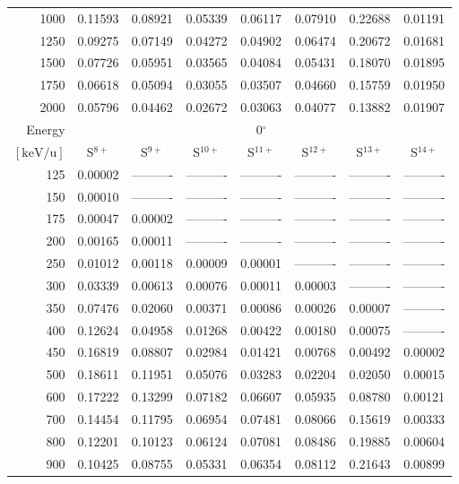 \begin{table}[ht]
\begin{tabular}{r|c|c|c|c|c|c|c}
     1000 & 0.11593 & 0.08921 & 0.05339 & 0.06117 & 0.07910 & 0.22688 & 0.01191 \\
     1250 & 0.09275 & 0.07149 & 0.04272 & 0.04902 & 0.06474 & 0.20672 & 0.01681 \\
     1500 & 0.07726 & 0.05951 & 0.03565 & 0.04084 & 0.05431 & 0.18070 & 0.01895 \\
     1750 & 0.06618 & 0.05094 & 0.03055 & 0.03507 & 0.04660 & 0.15759 & 0.01950 \\
     2000 & 0.05796 & 0.04462 & 0.02672 & 0.03063 & 0.04077 & 0.13882 & 0.01907 \\ \cline{1-8}
    Energy & \multicolumn{7}{c}{0$^\circ$} \\ \cline{2-8}
    $\mathrm{[keV/u]}$ & S$^{8+}$ & S$^{9+}$ & S$^{10+}$ & S$^{11+}$ & S$^{12+}$ & S$^{13+}$ & S$^{14+}$ \\ \cline{1-8}
      125 & 0.00002 & ---------- & ---------- & ---------- & ---------- & ---------- & ---------- \\
      150 & 0.00010 & ---------- & ---------- & ---------- & ---------- & ---------- & ---------- \\
      175 & 0.00047 & 0.00002 & ---------- & ---------- & ---------- & ---------- & ---------- \\
      200 & 0.00165 & 0.00011 & ---------- & ---------- & ---------- & ---------- & ---------- \\
      250 & 0.01012 & 0.00118 & 0.00009 & 0.00001 & ---------- & ---------- & ---------- \\
      300 & 0.03339 & 0.00613 & 0.00076 & 0.00011 & 0.00003 & ---------- & ---------- \\
      350 & 0.07476 & 0.02060 & 0.00371 & 0.00086 & 0.00026 & 0.00007 & ---------- \\
      400 & 0.12624 & 0.04958 & 0.01268 & 0.00422 & 0.00180 & 0.00075 & ---------- \\
      450 & 0.16819 & 0.08807 & 0.02984 & 0.01421 & 0.00768 & 0.00492 & 0.00002 \\
      500 & 0.18611 & 0.11951 & 0.05076 & 0.03283 & 0.02204 & 0.02050 & 0.00015 \\
      600 & 0.17222 & 0.13299 & 0.07182 & 0.06607 & 0.05935 & 0.08780 & 0.00121 \\
      700 & 0.14454 & 0.11795 & 0.06954 & 0.07481 & 0.08066 & 0.15619 & 0.00333 \\
      800 & 0.12201 & 0.10123 & 0.06124 & 0.07081 & 0.08486 & 0.19885 & 0.00604 \\
      900 & 0.10425 & 0.08755 & 0.05331 & 0.06354 & 0.08112 & 0.21643 & 0.00899 \\

\end{tabular}
\end{table}
